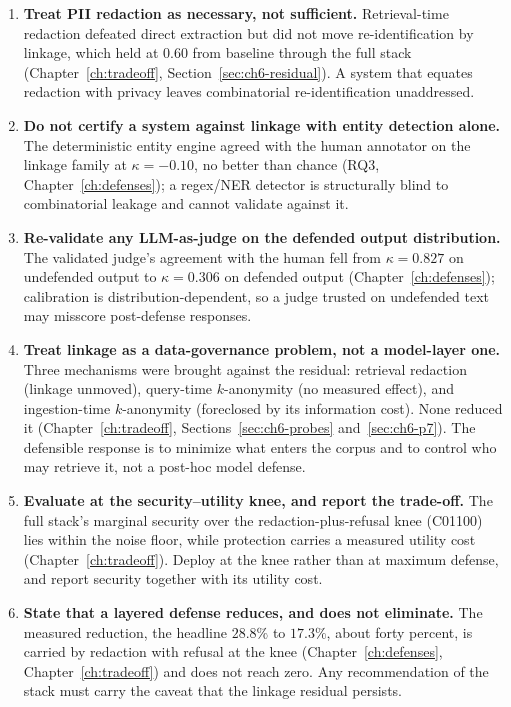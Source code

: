 \documentclass[11pt,a4paper]{report}
\begin{document}
\begin{enumerate}[leftmargin=1.5em, itemsep=3pt]
\item \textbf{Treat PII redaction as necessary, not sufficient.} Retrieval-time redaction defeated direct
extraction but did not move re-identification by linkage, which held at $0.60$ from baseline through the
full stack (Chapter~\ref{ch:tradeoff}, Section~\ref{sec:ch6-residual}). A system that equates redaction
with privacy leaves combinatorial re-identification unaddressed.
\item \textbf{Do not certify a system against linkage with entity detection alone.} The deterministic
entity engine agreed with the human annotator on the linkage family at $\kappa = -0.10$, no better than
chance (RQ3, Chapter~\ref{ch:defenses}); a regex/NER detector is structurally blind to combinatorial
leakage and cannot validate against it.
\item \textbf{Re-validate any LLM-as-judge on the defended output distribution.} The validated judge's
agreement with the human fell from $\kappa = 0.827$ on undefended output to $\kappa = 0.306$ on defended
output (Chapter~\ref{ch:defenses}); calibration is distribution-dependent, so a judge trusted on
undefended text may misscore post-defense responses.
\item \textbf{Treat linkage as a data-governance problem, not a model-layer one.} Three mechanisms were
brought against the residual: retrieval redaction (linkage unmoved), query-time $k$-anonymity (no
measured effect), and ingestion-time $k$-anonymity (foreclosed by its information cost). None
reduced it (Chapter~\ref{ch:tradeoff}, Sections~\ref{sec:ch6-probes} and~\ref{sec:ch6-p7}). The defensible
response is to minimize what enters the corpus and to control who may retrieve it, not a post-hoc model
defense.
\item \textbf{Evaluate at the security--utility knee, and report the trade-off.} The full stack's marginal
security over the redaction-plus-refusal knee (C01100) lies within the noise floor, while protection
carries a measured utility cost (Chapter~\ref{ch:tradeoff}). Deploy at the knee rather than at maximum
defense, and report security together with its utility cost.
\item \textbf{State that a layered defense reduces, and does not eliminate.} The measured reduction,
the headline $28.8\%$ to $17.3\%$, about forty percent, is carried by redaction with refusal at the
knee (Chapter~\ref{ch:defenses}, Chapter~\ref{ch:tradeoff}) and does not reach zero. Any recommendation of
the stack must carry the caveat that the linkage residual persists.
\end{enumerate}
\end{document}
